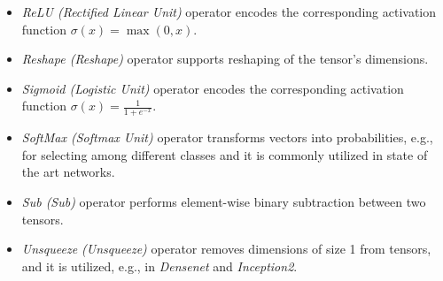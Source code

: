 \begin{itemize}
	\item \emph{ReLU (Rectified Linear Unit)} operator
	  encodes the corresponding activation function $\sigma(x) = \max(0, x)$.
	  
	\item \emph{Reshape (Reshape)} operator supports
	  reshaping of the tensor's dimensions.
	  
	\item \emph{Sigmoid (Logistic Unit)} operator
	  encodes the corresponding activation function $\sigma(x) =
	  \frac{1}{1 + e^{-x}}$.
	  
	\item \emph{SoftMax (Softmax Unit)} operator transforms
	  vectors into probabilities, e.g., for selecting among different
	  classes and it is commonly utilized in state of the art
	  networks.
	  
	\item \emph{Sub (Sub)} operator performs element-wise binary subtraction
		between two tensors.
	
	\item \emph{Unsqueeze (Unsqueeze)} operator removes dimensions of size
	  1 from tensors, and it is utilized, e.g., in \emph{Densenet} and
	  \emph{Inception2}.
\end{itemize}




